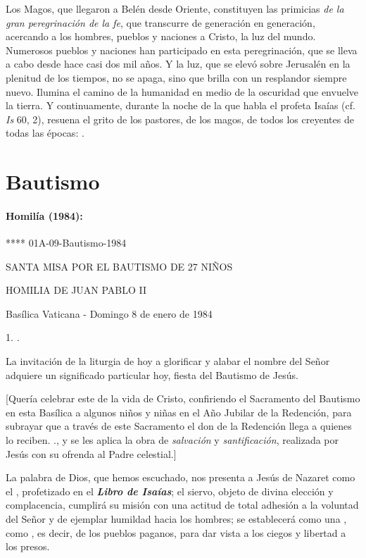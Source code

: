 \begin{body}
	Los Magos, que llegaron a Belén desde Oriente, constituyen las primicias \emph{de la gran peregrinación de la fe}, que transcurre de generación en generación, acercando a los hombres, pueblos y naciones a Cristo, la luz del mundo. Numerosos pueblos y naciones han participado en esta peregrinación, que se lleva a cabo desde hace casi dos mil años. Y la luz, que se elevó sobre Jerusalén en la plenitud de los tiempos, no se apaga, sino que brilla con un resplandor siempre nuevo. Ilumina el camino de la humanidad en medio de la oscuridad que envuelve la tierra. Y continuamente, durante la noche de la que habla el profeta Isaías (cf. \emph{Is} 60, 2), resuena el grito de los pastores, de los magos, de todos los creyentes de todas las épocas: .
	
	\chapter{Bautismo}
	
	\subsubsection{Homilía (1984): } **** 01A-09-Bautismo-1984
	
	SANTA MISA POR EL BAUTISMO DE 27 NIÑOS
	
	HOMILIA DE JUAN PABLO II
	
	Basílica Vaticana - Domingo 8 de enero de 1984
	
	1. \emph{.}
	
	La invitación de la liturgia de hoy a glorificar y alabar el nombre del Señor adquiere un significado particular hoy, fiesta del Bautismo de Jesús.
	
	{[}Quería celebrar este  de la vida de Cristo, confiriendo el Sacramento del Bautismo en esta Basílica a algunos niños y niñas en el Año Jubilar de la Redención, para subrayar que a través de este Sacramento el don de la Redención llega a quienes lo reciben. ., y se les aplica la obra de \emph{salvación} y \emph{santificación}, realizada por Jesús con su ofrenda al Padre celestial.{]}
	
	La palabra de Dios, que hemos escuchado, nos presenta a Jesús de Nazaret como el , profetizado en el \emph{\textbf{Libro de Isaías}}; el siervo, objeto de divina elección y complacencia, cumplirá su misión con una actitud de total adhesión a la voluntad del Señor y de ejemplar humildad hacia los hombres; se establecerá como una , como , es decir, de los pueblos paganos, para dar vista a los ciegos y libertad a los presos.
	

\end{body}
